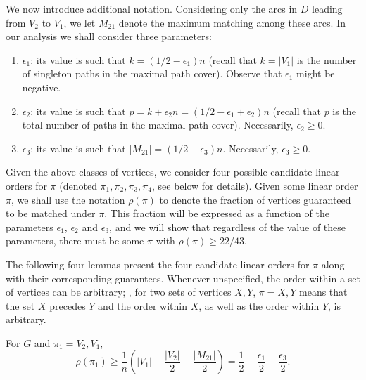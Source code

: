%
%

%
%
%
%

We now introduce additional notation.
Considering only the arcs in $D$ leading from $V_2$ to $V_1$, we let $M_{21}$ denote the maximum matching among these arcs. In our analysis we shall consider three parameters:

\begin{enumerate}
	
	\item $\epsilon_1$: its value is such that $k = \left(1/2 - \epsilon_1\right)n$ (recall that $k = |V_1|$ is the number of singleton paths in the maximal path cover). Observe that $\epsilon_1$ might be negative.
	
	\item $\epsilon_2$: its value is such that $p = k + \epsilon_2 n =  \left(1/2 - \epsilon_1 + \epsilon_2 \right)n$ (recall that $p$ is the total number of paths in the maximal path cover). Necessarily, $\epsilon_2 \ge 0$.
	
	\item $\epsilon_3$: its value is such that $|M_{21}| = \left(1/2 - \epsilon_3\right)n$. Necessarily, $\epsilon_3 \ge 0$.
	
\end{enumerate}

Given the above classes of vertices, we consider four possible candidate linear orders for $\pi$ (denoted $\pi_1, \pi_2, \pi_3, \pi_4$, see below for details). Given some linear order $\pi$, we shall use the notation $\rho(\pi)$ to denote the fraction of vertices guaranteed to be matched under $\pi$. This fraction will be expressed as a function of the parameters $\epsilon_1$, $\epsilon_2$ and $\epsilon_3$, and we will show that regardless of the value of these parameters, there must be some $\pi$ with $\rho(\pi) \ge 22/43$.

The following four lemmas present the four candidate linear orders for $\pi$ along with their corresponding guarantees.
Whenever unspecified, the order within a set of vertices can be arbitrary; \eg, for two sets of vertices $X,Y$, $\pi = X,Y$ means that the set $X$ precedes $Y$ and the order within $X$, as well as the order within $Y$, is arbitrary.

\begin{lemma}
	\label{lem:smallM21}
	For $G$ and $\pi_1 = V_2,V_1$, $$\rho(\pi_1) \ge \frac{1}{n}\left(|V_1|+\frac{|V_2|}{2} - \frac{|M_{21}|}{2}\right) = \frac{1}{2} - \frac{\epsilon_1}{2} + \frac{\epsilon_3}{2}.$$%
\end{lemma}

